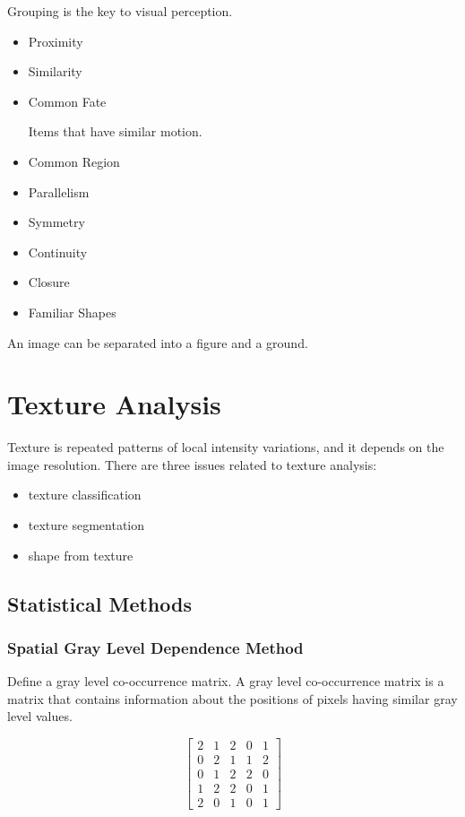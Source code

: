 \documentclass{article}
\begin{document}
\begin{multicols}{2}
Grouping is the key to visual perception. 

\begin{itemize}
  \item {Proximity}
  \item {Similarity}
  \item {Common Fate}
  
  Items that have similar motion.
  \item {Common Region}
  \item {Parallelism}
  \item {Symmetry}
  \item {Continuity}
  \item {Closure}
  \item {Familiar Shapes}
\end{itemize}

An image can be separated into a figure and a ground.

\section{Texture Analysis}

Texture is repeated patterns of local intensity variations, and it depends on the image resolution.
There are three issues related to texture analysis:

\begin{itemize}
  \item {texture classification}
  \item {texture segmentation}
  \item {shape from texture}
\end{itemize}

\subsection{Statistical Methods}

\subsubsection{Spatial Gray Level Dependence Method}

Define a gray level co-occurrence matrix. A gray level co-occurrence matrix is a matrix that contains information about the positions of pixels having similar gray level values.

  \[
    \begin{bmatrix}
      2 & 1 & 2 & 0 & 1\\
      0 & 2 & 1 & 1 & 2\\
      0 & 1 & 2 & 2 & 0\\
      1 & 2 & 2 & 0 & 1\\
      2 & 0 & 1 & 0 & 1
    \end{bmatrix}
  \]


\end{multicols}
\end{document}
